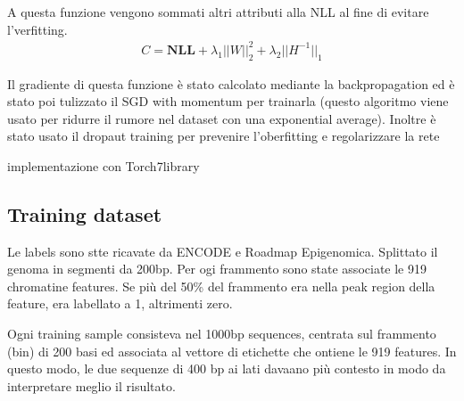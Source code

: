 A questa funzione vengono sommati altri attributi alla NLL al fine di evitare l'verfitting.
% 
\begin{gather*}
    C = \mathbf{NLL} + \lambda_1\vert\vert W \vert\vert_2^2 + \lambda_2 \vert\vert H^{-1} \vert\vert_1
\end{gather*}
% 

Il gradiente di questa funzione è stato calcolato mediante la backpropagation ed è stato poi tulizzato il SGD with momentum per trainarla (questo algoritmo viene usato per ridurre il rumore nel dataset con una exponential average). Inoltre è stato usato il dropaut training per prevenire l'oberfitting e regolarizzare la rete\,\cite{srivastava2014dropout}


implementazione con Torch7library

\subsection*{Training dataset}

Le labels sono stte ricavate da ENCODE e Roadmap Epigenomica. Splittato il genoma in segmenti da 200bp. Per ogi frammento sono state associate le 919 chromatine features. Se più del 50\% del frammento era nella peak region della feature, era labellato a 1, altrimenti zero.

Ogni training sample consisteva nel 1000bp sequences, centrata sul frammento (bin) di 200 basi ed associata al vettore di etichette che ontiene le 919 features. In questo modo, le due sequenze di 400 bp ai lati davaano più contesto in modo da interpretare meglio il risultato.



